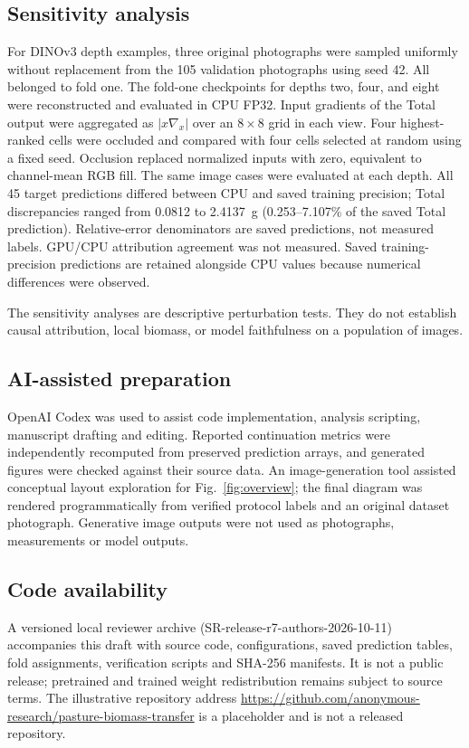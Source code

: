 \documentclass[pdflatex,a4paper,sn-nature]{sn-jnl}
\begin{document}
\subsection{Sensitivity analysis}
For DINOv3 depth examples, three original photographs were sampled uniformly without replacement from the 105 validation photographs using seed 42. All belonged to fold one. The fold-one checkpoints for depths two, four, and eight were reconstructed and evaluated in CPU FP32. Input gradients of the Total output were aggregated as $|x\nabla_x|$ over an $8\times8$ grid in each view. Four highest-ranked cells were occluded and compared with four cells selected at random using a fixed seed. Occlusion replaced normalized inputs with zero, equivalent to channel-mean RGB fill. The same image cases were evaluated at each depth. All 45 target predictions differed between CPU and saved training precision; Total discrepancies ranged from 0.0812 to 2.4137~g (0.253--7.107\% of the saved Total prediction). Relative-error denominators are saved predictions, not measured labels. GPU/CPU attribution agreement was not measured. Saved training-precision predictions are retained alongside CPU values because numerical differences were observed.

The sensitivity analyses are descriptive perturbation tests. They do not establish causal attribution, local biomass, or model faithfulness on a population of images.

\subsection{AI-assisted preparation}
OpenAI Codex was used to assist code implementation, analysis scripting, manuscript drafting and editing. Reported continuation metrics were independently recomputed from preserved prediction arrays, and generated figures were checked against their source data. An image-generation tool assisted conceptual layout exploration for Fig.~\ref{fig:overview}; the final diagram was rendered programmatically from verified protocol labels and an original dataset photograph. Generative image outputs were not used as photographs, measurements or model outputs.

\subsection*{Code availability}
A versioned local reviewer archive (SR-release-r7-authors-2026-10-11) accompanies this draft with source code, configurations, saved prediction tables, fold assignments, verification scripts and SHA-256 manifests. It is not a public release; pretrained and trained weight redistribution remains subject to source terms. The illustrative repository address \url{https://github.com/anonymous-research/pasture-biomass-transfer} is a placeholder and is not a released repository.
\end{document}
